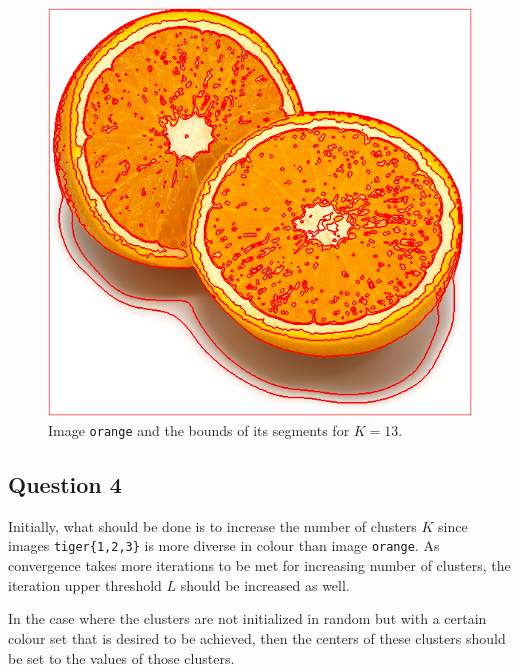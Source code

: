 {\begin{minipage}{\linewidth}
\begin{minipage}{0.45\linewidth}
\begin{figure}[H]
      \includegraphics[scale=0.36]{./images/01/kmeans2_13.png}
      \caption{Image \texttt{orange} and the bounds of its segments for $K=13$.}
      \label{fig:Q3:kmeans2_13}
    \end{figure}
  \end{minipage}
\end{minipage}
}

\subsection{Question 4}

Initially, what should be done is to increase the number of clusters $K$ since
images \texttt{tiger\{1,2,3\}} is more diverse in colour than image \texttt{orange}.
As convergence takes more iterations to be met for increasing number of clusters,
the iteration upper threshold $L$ should be increased as well.

In the case where the clusters are not initialized in random but with a
certain colour set that is desired to be achieved, then the centers of these
clusters should be set to the values of those clusters.
